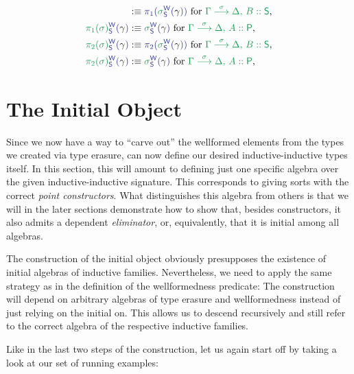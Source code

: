\begin{defn}
\begin{align*}
  &:\equiv \tqm{\pi_1(\grm{\sigma}^\WW_\Sc(\blgamma))}
  \text{ for \grm{\IISub{\sigma}{\Gamma}{\Delta,\, B :: \Sc}},} \\
\tqm{\grm{\pi_1(\sigma)}^\WW_\Sc(\blgamma)}
  &:\equiv \tqm{\grm{\sigma}^\WW_\Sc(\blgamma)}
  \text{ for \grm{\IISub{\sigma}{\Gamma}{\Delta,\, A :: \Pc}},} \\
\tqm{\grm{\pi_2(\sigma)}^\WW_\Sc(\blgamma)}
  &:\equiv \tqm{\pi_2(\grm{\sigma}^\WW_\Sc(\blgamma))}
  \text{ for \grm{\IISub{\sigma}{\Gamma}{\Delta,\, B :: \Sc}},} \\
\tqm{\grm{\pi_2(\sigma)}^\WW_\Sc(\blgamma)}
  &:\equiv \tqm{\grm{\sigma}^\WW_\Sc(\blgamma)}
  \text{ for \grm{\IISub{\sigma}{\Gamma}{\Delta,\, A :: \Pc}},}
\end{align*}

\section{The Initial Object}

Since we now have a way to ``carve out'' the wellformed elements from the types
we created via type erasure, can now define our desired inductive-inductive types
itself.
In this section, this will amount to defining just one specific algebra over the
given inductive-inductive signature.
This corresponds to giving sorts with the correct \emph{point constructors}.
What distinguishes this algebra from others is that we will in the later sections
demonstrate how to show that, besides constructors, it also admits a dependent
\emph{eliminator}, or, equivalently, that it is initial among all algebras.

The construction of the initial object obviously presupposes the existence of
initial algebras of inductive families.
Nevertheless, we need to apply the same strategy as in the definition of the
wellformedness predicate:
The construction will depend on arbitrary algebras of type erasure and wellformedness
instead of just relying on the initial on.
This allows us to descend recursively and still refer to the correct algebra
of the respective inductive families.

Like in the last two steps of the construction, let us again start off by taking
a look at our set of running examples:


\end{defn}
